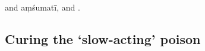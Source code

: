 \begin{translation}
%
 and
\gls{aṃśumatī},
and 
.
    
    \end{translation}

    \subsection{Curing the `slow-acting' poison}
    

